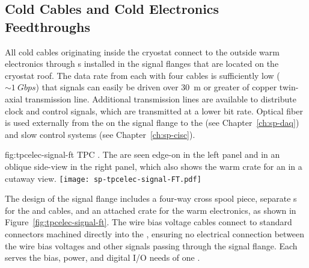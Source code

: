 \subsection{Cold Cables and Cold Electronics Feedthroughs}
\label{sec:fdsp-tpcelec-design-ft}

All cold cables originating inside the cryostat connect to the outside 
warm electronics through  \fdth{}s installed in the signal 
flanges that are located on the cryostat roof. The data rate from each
 with four cables is sufficiently low ($\sim\SI{1}{Gbps}$)
that  signals can easily be driven over \SI{30}{m} or greater
of copper twin-axial transmission line. Additional transmission lines
are available to distribute  clock and control signals,
which are transmitted at a lower bit rate.
Optical fiber is used externally from the  on the signal 
flange to the  (see Chapter~\ref{ch:sp-daq}) and slow 
control systems (see Chapter~\ref{ch:sp-cisc}).

\begin{dunefigure}
{fig:tpcelec-signal-ft}
{TPC  \fdth. The  are seen edge-on in the left 
panel and in an oblique side-view in the right panel, which also shows 
the warm crate for an  in a cutaway view.}
\texttt{[image: sp-tpcelec-signal-FT.pdf]}
\end{dunefigure}

The design of the signal flange includes a four-way cross spool 
piece, separate  \fdth{}s for the  and 
 cables, and an attached crate for the  
warm electronics, as shown in Figure~\ref{fig:tpcelec-signal-ft}.
The wire bias voltage cables connect to standard  
connectors machined directly into the  \fdth{}, ensuring 
no electrical connection between the wire bias voltages and other 
signals passing through the signal flange. Each  \fdth 
serves the bias, power, and digital I/O needs of one .  

